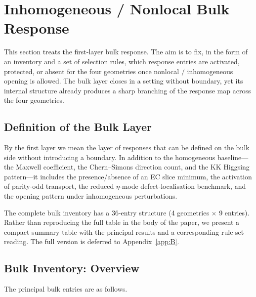 \section{Inhomogeneous / Nonlocal Bulk Response}
\label{sec:bulk}

This section treats the first-layer bulk response.  The aim is to fix, in the
form of an inventory and a set of selection rules, which response entries are
activated, protected, or absent for the four geometries once nonlocal /
inhomogeneous opening is allowed.  The bulk layer closes in a setting without
boundary, yet its internal structure already produces a sharp branching of
the response map across the four geometries.

\subsection{Definition of the Bulk Layer}
\label{sec:bulk:def}

By the first layer we mean the layer of responses that can be defined on the
bulk side without introducing a boundary.  In addition to the homogeneous
baseline---the Maxwell coefficient, the Chern--Simons direction count, and
the KK Higgsing pattern---it includes the presence/absence of an EC slice
minimum, the activation of parity-odd transport, the reduced $\eta$-mode
defect-localisation benchmark, and the opening pattern under inhomogeneous
perturbations.

The complete bulk inventory has a 36-entry structure (4 geometries
$\times$ 9 entries).  Rather than reproducing the full table in the body of
the paper, we present a compact summary table with the principal results and
a corresponding rule-set reading.  The full version is deferred to
Appendix~\ref{app:B}.

\subsection{Bulk Inventory: Overview}
\label{sec:bulk:inventory}

The principal bulk entries are as follows.

